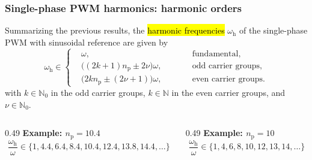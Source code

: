 \begin{frame}
    \frametitle{Single-phase PWM harmonics: harmonic orders}
    Summarizing the previous results, the \hl{harmonic frequencies} $\omega_\mathrm{h}$ of the single-phase PWM with sinusoidal reference are given by
    \begin{equation}
        \omega_\mathrm{h}\in
        \left\{
        \begin{aligned}
             & \omega, \qquad                                       &  & \text{fundamental,}         \\
             & \bigl((2k+1)n_\mathrm{p}\pm 2\nu\bigr)\omega, \qquad &  & \text{odd carrier groups,}  \\
             & \bigl(2kn_\mathrm{p}\pm (2\nu+1)\bigr)\omega, \qquad &  & \text{even carrier groups.}
        \end{aligned}
        \right.
    \end{equation}
    with $k\in\mathbb{N}_0$ in the odd carrier groups, $k\in\mathbb{N}$ in the even carrier groups, and $\nu\in\mathbb{N}_0$.
    \vspace{0.5cm}
    \begin{columns}[T,onlytextwidth]
        \begin{column}{0.49\textwidth}
            \textbf{Example: $n_\mathrm{p}=10.4$}
            \begin{equation*}
                \frac{\omega_\mathrm{h}}{\omega}\in\{1,4.4,6.4,8.4,10.4,12.4,13.8,14.4,\ldots\}
            \end{equation*}
        \end{column}
        \begin{column}{0.49\textwidth}
            \textbf{Example: $n_\mathrm{p}=10$}
            \begin{equation*}
                \frac{\omega_\mathrm{h}}{\omega}\in\{1,4,6,8,10,12,13,14,\ldots\}
            \end{equation*}
        \end{column}
    \end{columns}
\end{frame}

